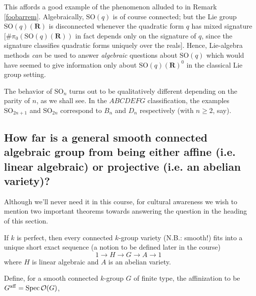 \documentclass[10pt]{article}
\newcommand{\cO}{\mathcal{O}}
\newcommand{\RR}{\mathbf{R}}
\renewcommand{\(}{\left(}
\renewcommand{\)}{\right)}
\newcommand{\Spec}{\operatorname{Spec}}
\newcommand{\SO}{\mathrm{SO}}
\numberwithin{thm}{subsection}
\begin{document}
\begin{ex}[$B_n$ and $D_n$]
\begin{rem}
This affords a good example of the phenomenon alluded to in Remark \ref{foobarrem}.
Algebraically, $\SO(q)$ is of course connected; but
the Lie group $\SO(q)(\RR)$ is disconnected whenever the quadratic form $q$ 
has mixed signature [$\#\pi_0(\SO(q)(\RR))$ in fact depends only on the signature of $q$, since the
signature classifies quadratic forms uniquely over the reals].
Hence, Lie-algebra methods {\em can} be used to answer {\em algebraic} questions about $\SO(q)$
 which would have seemed to give information only about $\SO(q)(\RR)^0$
in the classical Lie group setting.
\end{rem}
\begin{rem}
The behavior of $\SO_n$ turns out to be qualitatively different
depending on the parity of $n$, as we shall see.
In the $ABCDEFG$ classification, the examples $\SO_{2n+1}$ and $\SO_{2n}$
correspond to $B_n$ and $D_n$ respectively (with $n \ge 2$, say). 
\end{rem}
\end{ex}

\subsection{How far is a general smooth connected 
algebraic group from being either affine (i.e. linear algebraic) or projective (i.e. an abelian  variety)?}

Although we'll never need it in this course,
for cultural awareness we wish to mention two important theorems towards answering the question in the heading of this section.
\begin{thm}[Chevalley]If $k$ is perfect, then every connected $k$-group variety (N.B.: smooth!) fits into a unique short exact sequence (a notion to be defined later in the course)
\[1\to H\to G\to A\to 1\]
where $H$ is linear algebraic and $A$ is an abelian variety.
\end{thm}

Define, for a smooth connected $k$-group $G$ of finite type,
the affinization to be $G^{\rm{aff}}=\Spec\cO(G)$,
\end{document}
